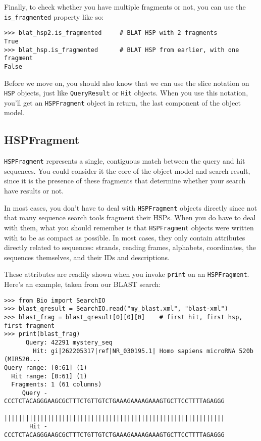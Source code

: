 Finally, to check whether you have multiple fragments or not, you can use the
\verb|is_fragmented| property like so:

\begin{verbatim}
>>> blat_hsp2.is_fragmented     # BLAT HSP with 2 fragments
True
>>> blat_hsp.is_fragmented      # BLAT HSP from earlier, with one fragment
False
\end{verbatim}

Before we move on, you should also know that we can use the slice notation on
\verb|HSP| objects, just like \verb|QueryResult| or \verb|Hit| objects. When
you use this notation, you'll get an \verb|HSPFragment| object in return, the
last component of the object model.

\subsection{HSPFragment}
\label{sec:searchio-hspfragment}

\verb|HSPFragment| represents a single, contiguous match between the query and
hit sequences. You could consider it the core of the object model and search
result, since it is the presence of these fragments that determine whether your
search have results or not.

In most cases, you don't have to deal with \verb|HSPFragment| objects directly
since not that many sequence search tools fragment their HSPs. When you do have
to deal with them, what you should remember is that \verb|HSPFragment| objects
were written with to be as compact as possible. In most cases, they only contain
attributes directly related to sequences: strands, reading frames, alphabets,
coordinates, the sequences themselves, and their IDs and descriptions.

These attributes are readily shown when you invoke \verb|print| on an
\verb|HSPFragment|. Here's an example, taken from our BLAST search:

\begin{verbatim}
>>> from Bio import SearchIO
>>> blast_qresult = SearchIO.read("my_blast.xml", "blast-xml")
>>> blast_frag = blast_qresult[0][0][0]    # first hit, first hsp, first fragment
>>> print(blast_frag)
      Query: 42291 mystery_seq
        Hit: gi|262205317|ref|NR_030195.1| Homo sapiens microRNA 520b (MIR520...
Query range: [0:61] (1)
  Hit range: [0:61] (1)
  Fragments: 1 (61 columns)
     Query - CCCTCTACAGGGAAGCGCTTTCTGTTGTCTGAAAGAAAAGAAAGTGCTTCCTTTTAGAGGG
             |||||||||||||||||||||||||||||||||||||||||||||||||||||||||||||
       Hit - CCCTCTACAGGGAAGCGCTTTCTGTTGTCTGAAAGAAAAGAAAGTGCTTCCTTTTAGAGGG
\end{verbatim}

